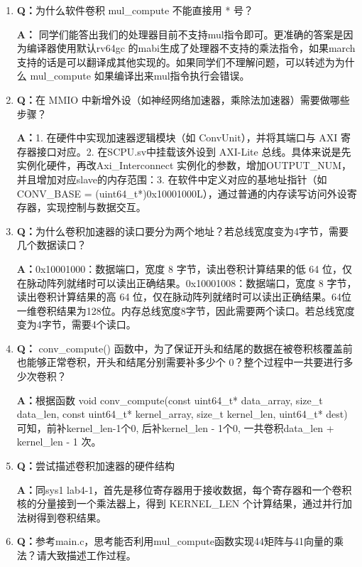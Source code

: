 \begin{enumerate}
    \item \textbf{Q：}为什么软件卷积 mul\_compute 不能直接用 * 号？

    \textbf{A：}
    同学们能答出我们的处理器目前不支持mul指令即可。更准确的答案是因为编译器使用默认rv64gc 的mabi生成了处理器不支持的乘法指令，如果march支持的话是可以翻译成其他实现的。如果同学们不理解问题，可以转述为为什么 mul\_compute 如果编译出来mul指令执行会错误。

    \item \textbf{Q：}在 MMIO 中新增外设（如神经网络加速器，乘除法加速器）需要做哪些步骤？

    \textbf{A：}1. 在硬件中实现加速器逻辑模块（如 ConvUnit），并将其端口与 AXI 寄存器接口对应。2. 在SCPU.sv中挂载该外设到 AXI-Lite 总线。具体来说是先实例化硬件，再改Axi\_Interconnect 实例化的参数，增加OUTPUT\_NUM，并且增加对应slave的内存范围：3. 在软件中定义对应的基地址指针（如 CONV\_BASE = (uint64\_t*)0x10001000L），通过普通的内存读写访问外设寄存器，实现控制与数据交互。

    \item \textbf{Q：}为什么卷积加速器的读口要分为两个地址？若总线宽度变为4字节，需要几个数据读口？

    \textbf{A：}0x10001000：数据端口，宽度 8 字节，读出卷积计算结果的低 64 位，仅在脉动阵列就绪时可以读出正确结果。0x10001008：数据端口，宽度 8 字节，读出卷积计算结果的高 64 位，仅在脉动阵列就绪时可以读出正确结果。64位一维卷积结果为128位。内存总线宽度8字节，因此需要两个读口。若总线宽度变为4字节，需要4个读口。

    \item \textbf{Q：} conv\_compute() 函数中，为了保证开头和结尾的数据在被卷积核覆盖前也能够正常卷积，开头和结尾分别需要补多少个 0？整个过程中一共要进行多少次卷积？

    \textbf{A：}根据函数 void conv\_compute(const uint64\_t* data\_array, size\_t data\_len, const uint64\_t* kernel\_array, size\_t kernel\_len, uint64\_t* dest) 可知，前补kernel\_len-1个0, 后补kernel\_len - 1个0, 一共卷积data\_len + kernel\_len - 1 次。

    \item \textbf{Q：}尝试描述卷积加速器的硬件结构

    \textbf{A：}同sys1 lab4-1，首先是移位寄存器用于接收数据，每个寄存器和一个卷积核的分量接到一个乘法器上，得到 KERNEL\_LEN 个计算结果，通过并行加法树得到卷积结果。

    \item \textbf{Q：}参考main.c，思考能否利用mul\_compute函数实现4\*4矩阵与4\*1向量的乘法？请大致描述工作过程。


\end{enumerate}
